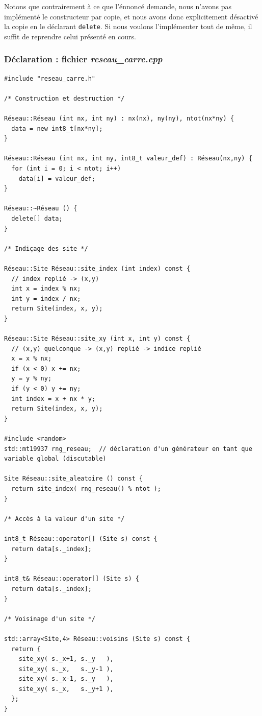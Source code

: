 \documentclass{book}
\newcommand{\inline}[1]{\texttt{#1}}
\def\filename{\emph}
\begin{document}
\begin{correction}
Notons que contrairement à ce que l'énnoncé demande, nous n'avons pas implémenté le constructeur par copie, et nous avons donc explicitement désactivé la copie en le déclarant \inline{delete}. Si nous voulons l'implémenter tout de même, il suffit de reprendre celui présenté en cours.

\subsubsection*{Déclaration : fichier \filename{reseau\_carre.cpp}}

\begin{verbatim}
#include "reseau_carre.h"

/* Construction et destruction */

Réseau::Réseau (int nx, int ny) : nx(nx), ny(ny), ntot(nx*ny) {
  data = new int8_t[nx*ny];
}

Réseau::Réseau (int nx, int ny, int8_t valeur_def) : Réseau(nx,ny) {
  for (int i = 0; i < ntot; i++)
    data[i] = valeur_def;
}

Réseau::~Réseau () {
  delete[] data;
}

/* Indiçage des site */

Réseau::Site Réseau::site_index (int index) const {
  // index replié -> (x,y)
  int x = index % nx;
  int y = index / nx;
  return Site(index, x, y);
}

Réseau::Site Réseau::site_xy (int x, int y) const {
  // (x,y) quelconque -> (x,y) replié -> indice replié
  x = x % nx;
  if (x < 0) x += nx;
  y = y % ny;
  if (y < 0) y += ny;
  int index = x + nx * y;
  return Site(index, x, y);
}

#include <random>
std::mt19937 rng_reseau;  // déclaration d'un générateur en tant que variable global (discutable)

Site Réseau::site_aleatoire () const {
  return site_index( rng_reseau() % ntot );
}

/* Accès à la valeur d'un site */

int8_t Réseau::operator[] (Site s) const {
  return data[s._index];
}

int8_t& Réseau::operator[] (Site s) {
  return data[s._index];
}

/* Voisinage d'un site */

std::array<Site,4> Réseau::voisins (Site s) const {
  return {
    site_xy( s._x+1, s._y   ),
    site_xy( s._x,   s._y-1 ),
    site_xy( s._x-1, s._y   ),
    site_xy( s._x,   s._y+1 ),
  };
}
\end{verbatim}


\end{correction}
\end{document}

